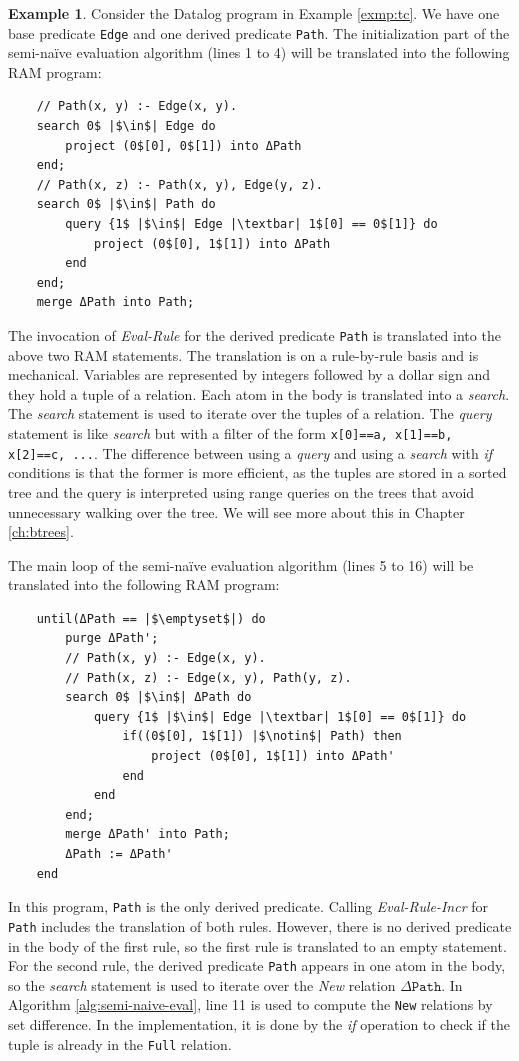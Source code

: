 \documentclass[11pt]{report}
\theoremstyle{definition}
\newtheorem{exmp}{Example}[chapter]
\begin{document}
\begin{exmp}
  Consider the Datalog program in Example \ref{exmp:tc}. We have one base predicate \texttt{Edge} and one derived predicate \texttt{Path}. The initialization part of the semi-naïve evaluation algorithm (lines 1 to 4) will be translated into the following RAM program:
  \begin{verbatim}
    // Path(x, y) :- Edge(x, y).
    search 0$ |$\in$| Edge do
        project (0$[0], 0$[1]) into ΔPath
    end;
    // Path(x, z) :- Path(x, y), Edge(y, z).
    search 0$ |$\in$| Path do
        query {1$ |$\in$| Edge |\textbar| 1$[0] == 0$[1]} do
            project (0$[0], 1$[1]) into ΔPath
        end
    end;
    merge ΔPath into Path;
  \end{verbatim}
  The invocation of \textit{Eval-Rule} for the derived predicate \texttt{Path} is translated into the above two RAM statements. The translation is on a rule-by-rule basis and is mechanical. Variables are represented by integers followed by a dollar sign and they hold a tuple of a relation. Each atom in the body is translated into a \textit{search}. The \textit{search} statement is used to iterate over the tuples of a relation. The \textit{query} statement is like \textit{search} but with a filter of the form \texttt{x[0]==a, x[1]==b, x[2]==c, ...}. The difference between using a \textit{query} and using a \textit{search} with \textit{if} conditions is that the former is more efficient, as the tuples are stored in a sorted tree and the query is interpreted using range queries on the trees that avoid unnecessary walking over the tree. We will see more about this in Chapter \ref{ch:btrees}.

  The main loop of the semi-naïve evaluation algorithm (lines 5 to 16) will be translated into the following RAM program:
  \begin{verbatim}
    until(ΔPath == |$\emptyset$|) do
        purge ΔPath';
        // Path(x, y) :- Edge(x, y).
        // Path(x, z) :- Edge(x, y), Path(y, z).
        search 0$ |$\in$| ΔPath do
            query {1$ |$\in$| Edge |\textbar| 1$[0] == 0$[1]} do
                if((0$[0], 1$[1]) |$\notin$| Path) then
                    project (0$[0], 1$[1]) into ΔPath'
                end
            end
        end;
        merge ΔPath' into Path;
        ΔPath := ΔPath'
    end
  \end{verbatim}

  In this program, \texttt{Path} is the only derived predicate. Calling \textit{Eval-Rule-Incr} for \texttt{Path} includes the translation of both rules. However, there is no derived predicate in the body of the first rule, so the first rule is translated to an empty statement. For the second rule, the derived predicate \texttt{Path} appears in one atom in the body, so the \textit{search} statement is used to iterate over the \textit{New} relation $\Delta \texttt{Path}$. In Algorithm \ref{alg:semi-naive-eval}, line 11 is used to compute the \texttt{New} relations by set difference. In the implementation, it is done by the \textit{if} operation to check if the tuple is already in the \texttt{Full} relation.
\end{exmp}
\label{exmp:tc-ram}
\end{document}
